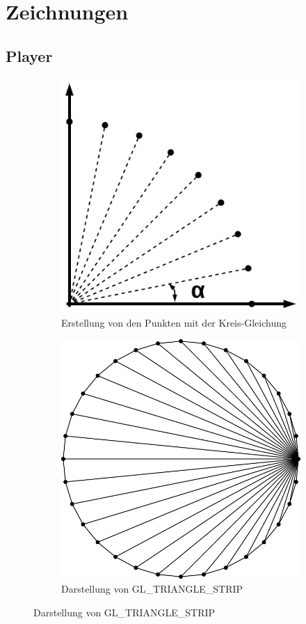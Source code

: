 \documentclass[doktyp=studarbeit]{TUBAFarbeiten}
\begin{document}
\section{Zeichnungen}

\subsection{Player}
\begin{figure}[!htb]
    \centering
    \begin{subfigure}[b]{0.4\textwidth}
        \centering
        \includegraphics[width=0.8\linewidth]{kreis-1.png}
        \caption{Erstellung von den Punkten mit der Kreis-Gleichung}
    \end{subfigure}
    \begin{subfigure}[b]{0.4\textwidth}
        \centering
        \includegraphics[width=0.8\linewidth]{kreis-2.png}
        \caption{Darstellung von GL\_TRIANGLE\_STRIP}
    \end{subfigure}
	\label{fig:circle}
\end{figure}
\end{document}
